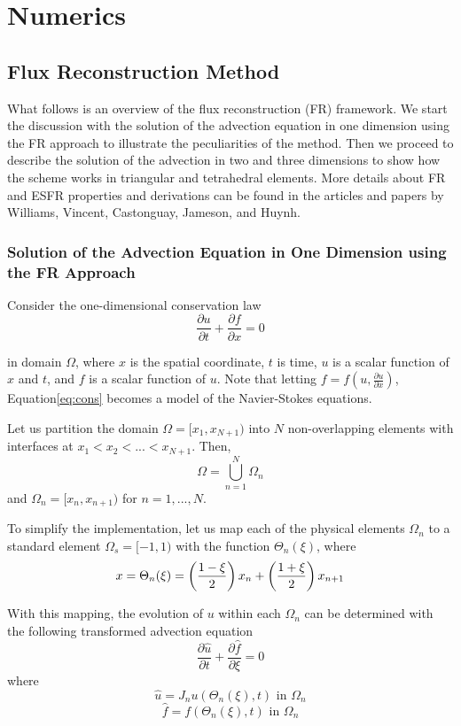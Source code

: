 
\section{Numerics}
\label{sec:numerics}
\subsection{Flux Reconstruction Method}

What follows is an overview of the flux reconstruction (FR) framework. We start the discussion with the solution of the advection equation in one dimension using the FR approach to illustrate the peculiarities of the method. Then we proceed to describe the solution of the advection in two and three dimensions to show how the scheme works in triangular and tetrahedral elements. 
More details about FR and ESFR properties and derivations can be found in the articles and papers by Williams, Vincent, Castonguay, Jameson, and Huynh.

\subsubsection{Solution of the Advection Equation in One Dimension using the FR Approach}

Consider the one-dimensional conservation law
\begin{equation}
\label{eq:cons}
\frac{\partial u}{\partial t} + \frac{\partial f}{\partial x} = 0
\end{equation}

in domain $\Omega$, where $x$ is the spatial coordinate, $t$ is time, $u$ is a scalar function of $x$ and $t$, and $f$ is a scalar function of $u$. Note that letting $f = f(u,\frac{\partial u}{\partial x})$, Equation\ref{eq:cons} becomes a model of the Navier-Stokes equations.

Let us partition the domain $\Omega = [x_1,x_{N+1})$ into $N$ non-overlapping elements with 
interfaces at $x_1<x_2<...<x_{N+1}$. Then,
$$
\Omega = \bigcup^N_{n=1} \Omega_n
$$
and $\Omega_n = [x_n,x_{n+1})$ for $n = 1,...,N$.

To simplify the implementation, let us map each of the physical elements $\Omega_n$ to a standard 
element $\Omega_s=[-1,1)$ with the function $\Theta_n(\xi)$, where
$$
x = \Theta_n(\xi) = \left( \frac{1-\xi}{2} \right) x_n + \left(\frac{1+\xi}{2}\right) x_{n+1} 
$$

With this mapping, the evolution of $u$ within each $\Omega_n$ can be determined with the following 
transformed advection equation
$$
\frac{\partial \hat{u}}{\partial t} + \frac{\partial \hat{f}}{\partial \xi} = 0
$$
where
$$
\hat{u} = J_n u(\Theta_n(\xi),t) \text{ in } \Omega_n
$$
$$
\hat{f} = f(\Theta_n(\xi),t) \text{ in } \Omega_n
$$

